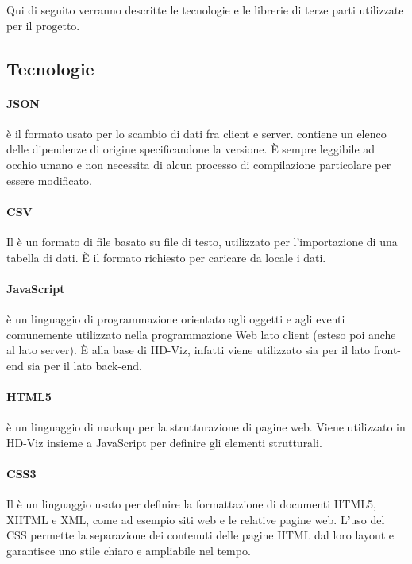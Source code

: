 \documentclass[../manuale_sviluppatore.tex]{subfiles}
\begin{document}
Qui di seguito verranno descritte le tecnologie e le librerie di terze parti utilizzate per il progetto.


\subsection{Tecnologie}

\paragraph{JSON}
 è il formato usato per lo scambio di dati fra client e server. contiene un elenco delle dipendenze di origine specificandone la versione. 
È sempre leggibile ad occhio umano e non necessita di alcun processo di compilazione particolare per essere modificato. 

\paragraph{CSV}
Il  è un formato di file basato su file di testo, utilizzato per l’importazione di una tabella di dati. 
È il formato richiesto per caricare da locale i dati.

\paragraph{JavaScript}
 è un linguaggio di programmazione orientato agli oggetti e agli eventi comunemente utilizzato nella programmazione Web lato client (esteso poi anche al lato server). 
È alla base di HD-Viz, infatti viene utilizzato sia per il lato front-end sia per il lato back-end. 

\paragraph{HTML5}
 è un linguaggio di markup per la strutturazione di pagine web. 
Viene utilizzato in HD-Viz insieme a JavaScript per definire gli elementi strutturali.

\paragraph{CSS3}
Il  è un linguaggio usato per definire la formattazione di documenti HTML5, XHTML e XML, come ad esempio siti web e le relative pagine web. 
L’uso del CSS permette la separazione dei contenuti delle pagine HTML dal loro layout e garantisce uno stile chiaro e ampliabile nel tempo. 
\end{document}
